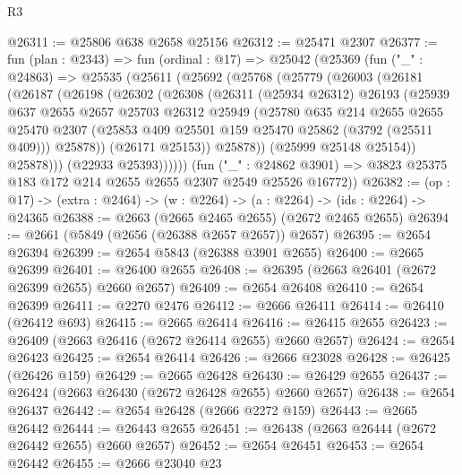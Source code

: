 \begin{lexlean}{R3}
\begin{coremodule}
@26311 := @25806 @638 @2658 @25156
@26312 := @25471 @2307
@26377 := fun (plan : @2343) =>
  fun (ordinal : @17) =>
  @25042
    (@25369
      (fun ("_" : @24863) =>
      @25535
        (@25611
          (@25692
            (@25768
              (@25779
                (@26003
                  (@26181
                    (@26187
                      (@26198
                        (@26302
                          (@26308
                            (@26311
                              (@25934 @26312)
                              @26193
                              (@25939
                                @637
                                @2655
                                @2657
                                @25703
                                @26312
                                @25949
                                (@25780
                                  @635
                                  @214
                                  @2655
                                  @2655
                                  @25470
                                  @2307
                                  (@25853 @409 @25501 @159 @25470 @25862 (@3792 (@25511 @409)))
                                  @25878))
                              (@26171 @25153))
                            @25878))
                        (@25999 @25148 @25154))
                      @25878)))
                (@22933 @25393))))))
      (fun ("_" : @24862 @3901) =>
      @3823 @25375 @183 @172 @214 @2655 @2655 @2307 @2549 @25526 @16772))
@26382 := (op : @17) -> (extra : @2464) -> (w : @2264) -> (a : @2264) -> (ids : @2264) -> @24365
@26388 := @2663 (@2665 @2465 @2655) (@2672 @2465 @2655)
@26394 := @2661 (@5849 (@2656 (@26388 @2657 @2657)) @2657)
@26395 := @2654 @26394
@26399 := @2654 @5843 (@26388 @3901 @2655)
@26400 := @2665 @26399
@26401 := @26400 @2655
@26408 := @26395 (@2663 @26401 (@2672 @26399 @2655) @2660 @2657)
@26409 := @2654 @26408
@26410 := @2654 @26399
@26411 := @2270 @2476
@26412 := @2666 @26411
@26414 := @26410 (@26412 @693)
@26415 := @2665 @26414
@26416 := @26415 @2655
@26423 := @26409 (@2663 @26416 (@2672 @26414 @2655) @2660 @2657)
@26424 := @2654 @26423
@26425 := @2654 @26414
@26426 := @2666 @23028
@26428 := @26425 (@26426 @159)
@26429 := @2665 @26428
@26430 := @26429 @2655
@26437 := @26424 (@2663 @26430 (@2672 @26428 @2655) @2660 @2657)
@26438 := @2654 @26437
@26442 := @2654 @26428 (@2666 @2272 @159)
@26443 := @2665 @26442
@26444 := @26443 @2655
@26451 := @26438 (@2663 @26444 (@2672 @26442 @2655) @2660 @2657)
@26452 := @2654 @26451
@26453 := @2654 @26442
@26455 := @2666 @23040 @23

\end{coremodule}
\end{lexlean}
